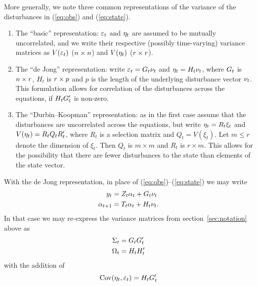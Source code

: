 More generally, we note three common representations of the
variance of the disturbances in (\ref{eq:obs}) and (\ref{eq:state}).
\begin{enumerate}
\item The ``basic'' representation: $\varepsilon_t$
  and $\eta_t$ are assumed to be mutually uncorrelated, and we
  write their respective (possibly time-varying) variance matrices as
  $V(\varepsilon_t)$ ($n \times n$) and $V(\eta_t)$ ($r \times r$).
\item The ``de Jong'' representation: write
  $\varepsilon_t = G_t\nu_t$ and
  $\eta_t = H_t\nu_t$, where $G_t$ is
  $n \times r$, $H_t$ is $r \times p$ and $p$ is the
  length of the underlying disturbance vector $\nu_t$. This
  formulation allows for correlation of the disturbances across the
  equations, if $H_tG_t'$ is non-zero.
\item The ``Durbin--Koopman'' representation: as in the first case
  assume that the disturbances are uncorrelated across the equations,
  but write $\eta_t = R_t \xi_t$ and $V(\eta_t) = R_tQ_tR_t'$,
  where $R_t$ is a selection matrix and $Q_t = V(\xi_t)$. Let
  $m \leq r$ denote the dimension of $\xi_t$. Then $Q_t$ is
  $m \times m$ and $R_t$ is $r \times m$. This allows for the
  possibility that there are fewer disturbances to the state than
  elements of the state vector.
\end{enumerate}

With the de Jong representation, in place of
(\ref{eq:obs})--(\ref{eq:state}) we may write
%
\begin{align*}
  y_t &= Z_t \alpha_t +
     G_t \nu_t \\
  \alpha_{t+1} &= T_t \alpha_t +
     H_t \nu_t .
\end{align*}
%
In that case we may re-express the variance matrices from
section~\ref{sec:notation} above as
\begin{align*}
  \Sigma_t &= G_t G_t' \\
  \Omega_t &= H_t H_t'
\end{align*}
with the addition of
\[
  \mbox{Cov}(\eta_t,\varepsilon_t) = H_t G_t'
\]

